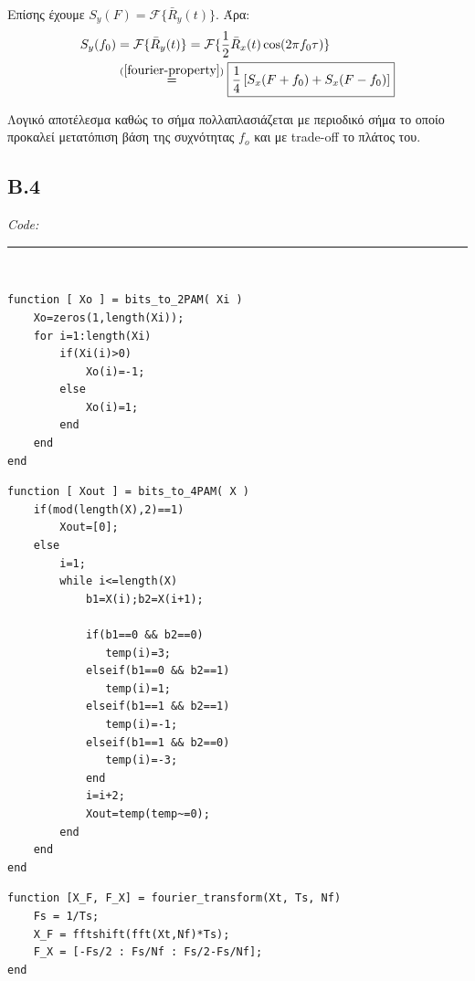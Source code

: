 \documentclass[11pt]{article}
\begin{document}
    \par \noindent
    Επίσης έχουμε $S_y(F) = \mathcal{F}\{\bar{R}_{y}(t)\} $. Άρα:
    \begin{align*}
        S_y(f_0) &= \mathcal{F}\{\bar{R}_{y}(t)\} = \mathcal{F}\{\frac{1}{2}\bar{R}_{x}(t) \cos(2\pi f_0\tau)\} \\
        &\overset{(\ref{fourier-property})}{=} \boxed{\frac{1}{4} \left[ S_x(F+f_0)  + S_x(F-f_0) \right]}
    \end{align*}
    
    \par \noindent
    Λογικό αποτέλεσμα καθώς το σήμα πολλαπλασιάζεται με περιοδικό σήμα το οποίο προκαλεί μετατόπιση βάση της συχνότητας $f_o$ και με trade-off το πλάτος του.
    
    \subsection*{B.4}
    
    
%
%
%
\newpage

\emph{Code:} \\
\rule{\linewidth}{0.3mm} \\[0.1cm]
\begin{lstlisting}[caption = {\texttt{bits\_to\_2PAM.m}}]
function [ Xo ] = bits_to_2PAM( Xi )
    Xo=zeros(1,length(Xi));    
    for i=1:length(Xi)    
        if(Xi(i)>0)          
            Xo(i)=-1;        
        else
            Xo(i)=1;    
        end
    end
end
\end{lstlisting}

\begin{lstlisting}[caption = {\texttt{bits\_to\_4PAM.m}}]
function [ Xout ] = bits_to_4PAM( X )
    if(mod(length(X),2)==1)
        Xout=[0];
    else
        i=1;
        while i<=length(X)
            b1=X(i);b2=X(i+1);
 
            if(b1==0 && b2==0)
               temp(i)=3; 
            elseif(b1==0 && b2==1)
               temp(i)=1;
            elseif(b1==1 && b2==1)
               temp(i)=-1; 
            elseif(b1==1 && b2==0)
               temp(i)=-3;      
            end
            i=i+2;
            Xout=temp(temp~=0);
        end
    end
end
\end{lstlisting}
\begin{lstlisting}[caption = {\texttt{fourier\_transform.m}}]
function [X_F, F_X] = fourier_transform(Xt, Ts, Nf)
    Fs = 1/Ts;
    X_F = fftshift(fft(Xt,Nf)*Ts);
    F_X = [-Fs/2 : Fs/Nf : Fs/2-Fs/Nf];
end
\end{lstlisting}
\end{document}
